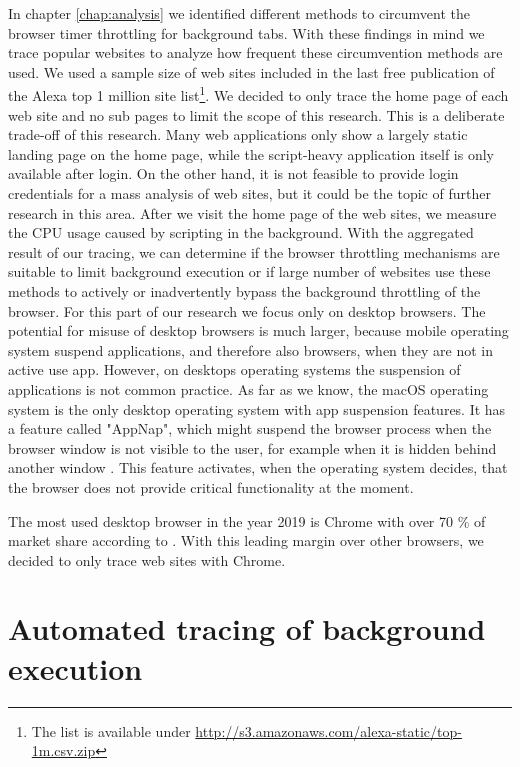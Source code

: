 \documentclass[
	ruledheaders=section,%
	class=report,%
	thesis={type=bachelor},%
	accentcolor=9c,%
	custommargins=true,%
	marginpar=false,%
	parskip=half-,%
	fontsize=11pt,%
]{tudapub}
\begin{document}
  In chapter \ref{chap:analysis} we identified different methods to circumvent the browser timer throttling for background tabs. With these findings in mind we trace popular websites to analyze how frequent these circumvention methods are used. We used a sample size of web sites included in the last free publication of the Alexa top 1 million site list\footnote{The list is available under \url{http://s3.amazonaws.com/alexa-static/top-1m.csv.zip}}. We decided to only trace the home page of each web site and no sub pages to limit the scope of this research. This is a deliberate trade-off of this research. Many web applications only show a largely static landing page on the home page, while the script-heavy application itself is only available after login. On the other hand, it is not feasible to provide login credentials for a mass analysis of web sites, but it could be the topic of further research in this area. After we visit the home page of the web sites, we measure the CPU usage caused by scripting in the background. With the aggregated result of our tracing, we can determine if the browser throttling mechanisms are suitable to limit background execution or if large number of websites use these methods to actively or inadvertently bypass the background throttling of the browser. For this part of our research we focus only on desktop browsers. The potential for misuse of desktop browsers is much larger, because mobile operating system suspend applications, and therefore also browsers, when they are not in active use app. However, on desktops operating systems the suspension of applications is not common practice. As far as we know, the macOS operating system is the only desktop operating system with app suspension features. It has a feature called "AppNap", which might suspend the browser process when the browser window is not visible to the user, for example when it is hidden behind another window \cite{osx-app-nap}. This feature activates, when the operating system decides, that the browser does not provide critical functionality at the moment.

  The most used desktop browser in the year 2019 is Chrome with over 70 \% of market share according to \cite{statcounter-desktop-browser-market-share}. With this leading margin over other browsers, we decided to only trace web sites with Chrome.
  
  \section{Automated tracing of background execution}
\end{document}
